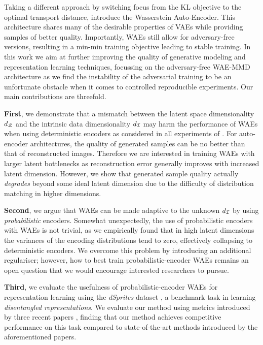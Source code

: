 Taking a different approach by switching focus from the KL objective to the optimal transport distance, \cite{TBG+17} introduce the Wasserstein Auto-Encoder. This architecture shares many of the desirable properties of VAEs while providing samples of better quality. 
Importantly, WAEs still allow for adversary-free versions, resulting in a min-min training objective leading to stable training.
In this work we aim at further improving the quality of generative modeling and representation learning techniques, focussing on the adversary-free WAE-MMD architecture as we find the instability of the adversarial training to be an unfortunate obstacle when it comes to controlled reproducible experiments.
Our main contributions are threefold.

\textbf{First}, we demonstrate that a mismatch between the latent space dimensionality $d_{\mathcal{Z}}$ and the intrinsic data dimensionality $d_{\mathcal{I}}$ may harm the performance of WAEs when using deterministic encoders as considered in all experiments of \cite{TBG+17}.
For auto-encoder architectures, the quality of generated samples can be no better than that of reconstructed images. Therefore we are interested in training WAEs with larger latent bottlenecks as reconstruction error generally improves with increased latent dimension.
However, we show that generated sample quality actually \emph{degrades} beyond some ideal latent dimension due to the difficulty of distribution matching in higher dimensions.  

\textbf{Second}, we argue that WAEs can be made adaptive to the unknown $d_{\mathcal{I}}$ by using \emph{probabilistic} encoders.
Somewhat unexpectedly, the use of probabilistic encoders with WAEs is not trivial, as we empirically found that in high latent dimensions the variances of the encoding distributions tend to zero, effectively collapsing to deterministic encoders.
We overcome this problem by introducing an additional regulariser; 
however, how to best train probabilistic-encoder WAEs remains an open question that we would encourage interested researchers to pursue.


\textbf{Third}, we evaluate the usefulness of probabilistic-encoder WAEs for representation learning using the \emph{dSprites} dataset \citep{dsprites17}, a benchmark task in learning \emph{disentangled representations}. We evaluate our method using metrics introduced by three recent papers \citep{HM+17, kumar2017variational, kim2018disentangling}, finding that our method achieves competitive performance on this task compared to state-of-the-art methods introduced by the aforementioned papers.

